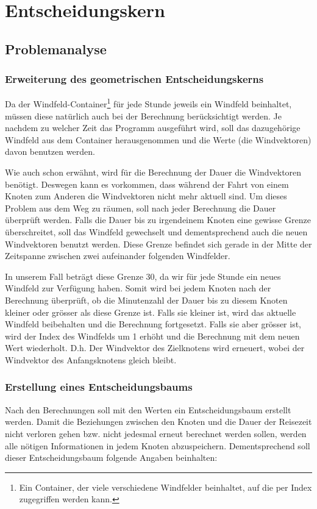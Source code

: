 
\section{Entscheidungskern}

\subsection{Problemanalyse}
\subsubsection{Erweiterung des geometrischen Entscheidungskerns}
Da der Windfeld-Container\footnote{Ein Container, der viele verschiedene
Windfelder beinhaltet, auf die per Index zugegriffen werden kann.} für jede
Stunde jeweils ein Windfeld beinhaltet, müssen diese natürlich auch bei der
Berechnung berücksichtigt werden. Je nachdem zu welcher Zeit das Programm
ausgeführt wird, soll das dazugehörige Windfeld aus dem Container
herausgenommen und die Werte (die Windvektoren) davon benutzen werden. 

Wie auch schon erwähnt, wird für die Berechnung der Dauer die Windvektoren
benötigt. Deswegen kann es vorkommen, dass während der Fahrt von einem Knoten
zum Anderen die Windvektoren nicht mehr aktuell sind. Um dieses Problem aus
dem Weg zu räumen, soll nach jeder Berechnung die Dauer überprüft werden.
Falls die Dauer bis zu irgendeinem Knoten eine gewisse Grenze überschreitet,
soll das Windfeld gewechselt und dementsprechend  auch die neuen Windvektoren
benutzt werden. Diese Grenze befindet sich gerade in der Mitte der Zeitspanne
zwischen zwei aufeinander folgenden Windfelder. 

In unserem Fall beträgt diese Grenze 30, da wir für jede Stunde ein neues
Windfeld zur Verfügung haben. Somit wird bei jedem Knoten nach der Berechnung
überprüft, ob die Minutenzahl der Dauer bis zu diesem Knoten kleiner oder
grösser als diese Grenze ist. Falls sie kleiner ist, wird das aktuelle
Windfeld beibehalten und die Berechnung fortgesetzt. Falls sie aber grösser
ist, wird der Index des Windfelds um 1 erhöht und die Berechnung mit dem neuen
Wert wiederholt. D.h. Der Windvektor des Zielknotens wird erneuert, wobei der
Windvektor des Anfangsknotens gleich bleibt.

\subsubsection{Erstellung eines Entscheidungsbaums}
\label{aufg6:entscheidungsbaum}
Nach den Berechnungen soll mit den Werten ein Entscheidungsbaum erstellt
werden. Damit die Beziehungen zwischen den Knoten und die Dauer der Reisezeit
nicht verloren gehen bzw. nicht jedesmal erneut berechnet werden sollen,
werden alle nötigen Informationen in jedem Knoten abzuspeichern.
Dementsprechend soll dieser Entscheidungsbaum folgende Angaben beinhalten: 

